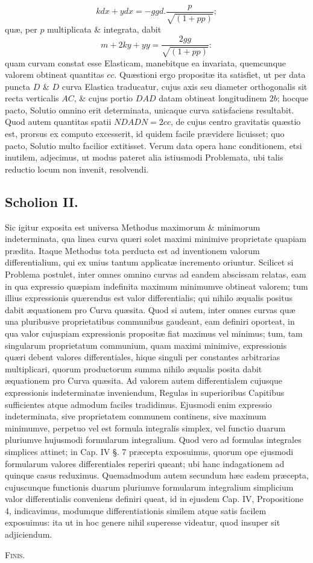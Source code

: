 \[kdx+ydx=-ggd.\frac p{\sqrt{(1+pp)}};\]
quæ, per $p$ multiplicata \& integrata, dabit
\[m+2ky+yy=\frac{2gg}{\sqrt{(1+pp)}}:\]
quam curvam constat esse Elasticam, manebitque ea invariata, quemcunque valorem obtineat quantitas $cc$. Quæstioni ergo propositæ ita satisfiet, ut per data puncta $D$ \& $D$ curva Elastica traducatur, cujus axis seu diameter orthogonalis sit recta verticalis $AC$, \& cujus portio $DAD$ datam obtineat longitudinem $2b$; hocque pacto, Solutio omnino erit determinata, unicaque curva satisfaciens resultabit. Quod autem quantitas spatii $NDADN=2cc$, de cujus centro gravitatis quæstio est, prorsus ex computo excesserit, id quidem facile prævidere licuisset; quo pacto, Solutio multo facilior extitisset. Verum data opera hanc conditionem, etsi inutilem, adjecimus, ut modus pateret alia istiusmodi Problemata, ubi talis reductio locum non invenit, resolvendi.
\subsection*{Scholion II.}
Sic igitur exposita est universa Methodus maximorum \& minimorum indeterminata, qua linea curva quæri solet maximi minimive proprietate quapiam prædita. Itaque Methodus tota perducta est ad inventionem valorum differentialium, qui ex unius tantum applicatæ incremento oriuntur. Scilicet si Problema postulet, inter omnes omnino curvas ad eandem abscissam relatas, eam in qua expressio quæpiam indefinita maximum minimumve obtineat valorem; tum illius expressionis quærendus est valor differentialis; qui nihilo æqualis positus dabit æquationem pro Curva quæsita. Quod si autem, inter omnes curvas quæ una pluribusve proprietatibus communibus gaudeant, eam definiri oporteat, in qua valor cujuspiam expressionis propositæ fiat maximus vel minimus; tum, tam singularum proprietatum communium, quam maximi minimive, expressionis quæri debent valores differentiales, hique singuli per constantes arbitrarias multiplicari, quorum productorum summa nihilo æqualis posita dabit æquationem pro Curva quæsita. Ad valorem autem differentialem cujusque expressionis indeterminatæ inveniendum, Regulas in superioribus Capitibus sufficientes atque admodum faciles tradidimus. Ejusmodi enim expressio indeterminata, sive proprietatem communem continens, sive maximum minimumve, perpetuo vel est formula integralis simplex, vel functio duarum pluriumve hujusmodi formularum integralium. Quod vero ad formulas integrales simplices attinet; in Cap. IV §. 7 præcepta exposuimus, quorum ope ejusmodi formularum valores differentiales reperiri queant; ubi hanc indagationem ad quinque casus reduximus. Quemadmodum autem secundum hæc eadem præcepta, cujuscunque functionis duarum pluriumve formularum integralium simplicium valor differentialis conveniens definiri queat, id in ejusdem Cap. IV, Propositione 4, indicavimus, modumque differentiationis similem atque satis facilem exposuimus: ita ut in hoc genere nihil superesse videatur, quod insuper sit adjiciendum.
\begin{center}\textsc{Finis.}\end{center}
